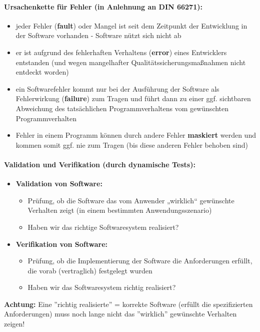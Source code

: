\paragraph{Ursachenkette für Fehler (in Anlehnung an DIN 66271):}

\begin{itemize}
	\item jeder Fehler (\textbf{fault}) oder Mangel ist seit dem Zeitpunkt der Entwicklung in der Software vorhanden - Software nützt sich nicht ab
	\item er ist aufgrund des fehlerhaften Verhaltens (\textbf{error}) eines Entwicklers entstanden (und wegen mangelhafter Qualitätssicherungsmaßnahmen nicht entdeckt worden)
	\item ein Softwarefehler kommt nur bei der Ausführung der Software als Fehlerwirkung (\textbf{failure}) zum Tragen und führt dann zu einer ggf. sichtbaren Abweichung des tatsächlichen Programmverhaltens vom gewünschten Programmverhalten
	\item Fehler in einem Programm können durch andere Fehler \textbf{maskiert} werden und kommen somit ggf. nie zum Tragen (bis diese anderen Fehler behoben sind)
\end{itemize}

\paragraph{Validation und Verifikation (durch dynamische Tests):}
\begin{itemize}
	\item \textbf{Validation von Software: }
	\begin{itemize}
		\item Prüfung, ob die Software das vom Anwender „wirklich“ gewünschte Verhalten zeigt (in einem bestimmten Anwendungsszenario)
		\item Haben wir das richtige Softwaresystem realisiert?
	\end{itemize}
	\item \textbf{Verifikation von Software: }
	\begin{itemize}
		\item Prüfung, ob die Implementierung der Software die Anforderungen erfüllt, die vorab (vertraglich) festgelegt wurden
		\item Haben wir das Softwaresystem richtig realisiert?
	\end{itemize}
\end{itemize}
\textbf{Achtung:} Eine ''richtig realisierte'' = korrekte Software (erfüllt die spezifizierten Anforderungen) 
muss noch lange nicht das ''wirklich'' gewünschte Verhalten zeigen!

